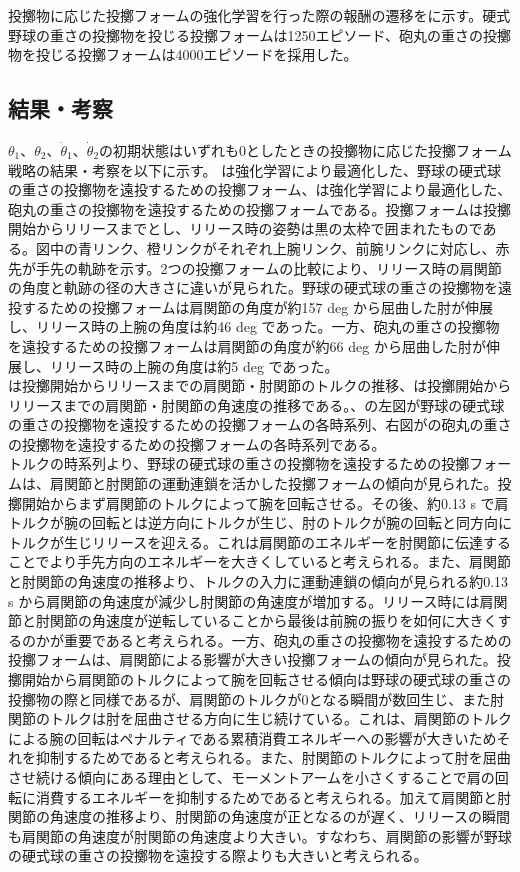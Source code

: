 投擲物に応じた投擲フォームの強化学習を行った際の報酬の遷移をに示す。硬式野球の重さの投擲物を投じる投擲フォームは1250エピソード、砲丸の重さの投擲物を投じる投擲フォームは4000エピソードを採用した。

\subsection{結果・考察}
$\theta_{1}$、$\theta_{2}$、$\dot{\theta}_{1}$、$\dot{\theta}_{2}$の初期状態はいずれも0としたときの投擲物に応じた投擲フォーム戦略の結果・考察を以下に示す。
は強化学習により最適化した、野球の硬式球の重さの投擲物を遠投するための投擲フォーム、は強化学習により最適化した、砲丸の重さの投擲物を遠投するための投擲フォームである。投擲フォームは投擲開始からリリースまでとし、リリース時の姿勢は黒の太枠で囲まれたものである。図中の青リンク、橙リンクがそれぞれ上腕リンク、前腕リンクに対応し、赤先が手先の軌跡を示す。2つの投擲フォームの比較により、リリース時の肩関節の角度と軌跡の径の大きさに違いが見られた。野球の硬式球の重さの投擲物を遠投するための投擲フォームは肩関節の角度が約157 deg から屈曲した肘が伸展し、リリース時の上腕の角度は約46 deg であった。一方、砲丸の重さの投擲物を遠投するための投擲フォームは肩関節の角度が約66 deg から屈曲した肘が伸展し、リリース時の上腕の角度は約5 deg であった。\\
は投擲開始からリリースまでの肩関節・肘関節のトルクの推移、は投擲開始からリリースまでの肩関節・肘関節の角速度の推移である。、の左図が野球の硬式球の重さの投擲物を遠投するための投擲フォームの各時系列、右図がの砲丸の重さの投擲物を遠投するための投擲フォームの各時系列である。\\
トルクの時系列より、野球の硬式球の重さの投擲物を遠投するための投擲フォームは、肩関節と肘関節の運動連鎖を活かした投擲フォームの傾向が見られた。投擲開始からまず肩関節のトルクによって腕を回転させる。その後、約0.13 s で肩トルクが腕の回転とは逆方向にトルクが生じ、肘のトルクが腕の回転と同方向にトルクが生じリリースを迎える。これは肩関節のエネルギーを肘関節に伝達することでより手先方向のエネルギーを大きくしていると考えられる。また、肩関節と肘関節の角速度の推移より、トルクの入力に運動連鎖の傾向が見られる約0.13 s から肩関節の角速度が減少し肘関節の角速度が増加する。リリース時には肩関節と肘関節の角速度が逆転していることから最後は前腕の振りを如何に大きくするのかが重要であると考えられる。一方、砲丸の重さの投擲物を遠投するための投擲フォームは、肩関節による影響が大きい投擲フォームの傾向が見られた。投擲開始から肩関節のトルクによって腕を回転させる傾向は野球の硬式球の重さの投擲物の際と同様であるが、肩関節のトルクが0となる瞬間が数回生じ、また肘関節のトルクは肘を屈曲させる方向に生じ続けている。これは、肩関節のトルクによる腕の回転はペナルティである累積消費エネルギーへの影響が大きいためそれを抑制するためであると考えられる。また、肘関節のトルクによって肘を屈曲させ続ける傾向にある理由として、モーメントアームを小さくすることで肩の回転に消費するエネルギーを抑制するためであると考えられる。加えて肩関節と肘関節の角速度の推移より、肘関節の角速度が正となるのが遅く、リリースの瞬間も肩関節の角速度が肘関節の角速度より大きい。すなわち、肩関節の影響が野球の硬式球の重さの投擲物を遠投する際よりも大きいと考えられる。

